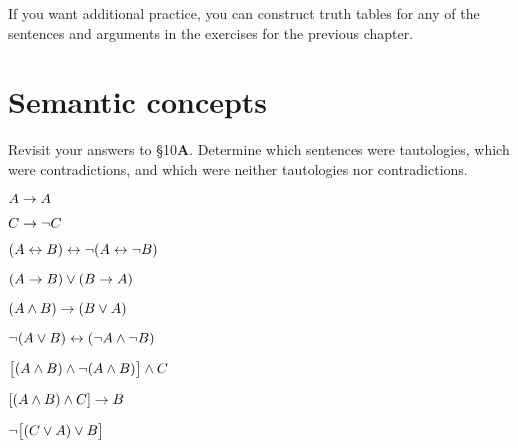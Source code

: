 If you want additional practice, you can construct truth tables for any of the sentences and arguments in the exercises for the previous chapter.



\chapter{Semantic concepts}\setcounter{ProbPart}{0}
\problempart
Revisit your answers to \S10\textbf{A}. Determine which sentences were tautologies, which were contradictions, and which were neither tautologies nor contradictions.
\begin{compactlist}
\item $A \rightarrow A$ \hfill {}
\item $C \rightarrow\neg C$ \hfill {}
\item $(A \leftrightarrow B) \leftrightarrow \neg(A\leftrightarrow \neg B)$  \hfill {}
\item $(A \rightarrow B) \vee (B \rightarrow A)$  \hfill {}
\item $(A \wedge B) \rightarrow (B \vee A)$  \hfill {}
\item $\neg(A \vee B) \leftrightarrow (\neg A \wedge \neg B)$ \hfill {}
\item $\bigl[(A\wedge B) \wedge\neg(A\wedge B)\bigr] \wedge C$  \hfill {}
\item $[(A \wedge B) \wedge C] \rightarrow B$  \hfill {}
\item $\neg\bigl[(C\vee A) \vee B\bigr]$  \hfill {}
\end{compactlist}

\

